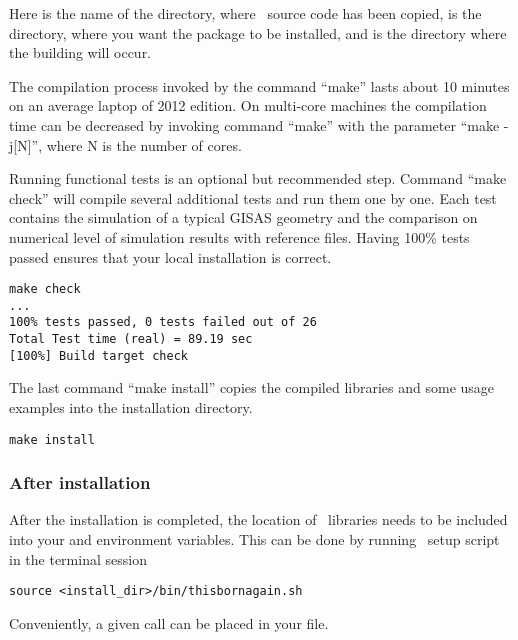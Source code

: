 Here  is the name of the directory, where \BornAgain\ source code has been
copied,  is the directory, where you want the package
to be installed, and  is the directory where the building will occur.



The compilation process invoked by the command ``make'' lasts about 10 minutes on an average laptop
of 2012 edition. On multi-core machines the compilation time  can be decreased by invoking command
``make'' with the parameter ``make -j[N]'', where N is the number of cores.

Running functional tests is an optional but recommended step. Command ``make check''
will compile several additional tests and run them one by one. Each test contains
the simulation of a typical GISAS geometry and the comparison on numerical level of simulation results with reference files. Having 100\% tests passed ensures that your local installation
is correct.
\begin{lstlisting}[language=shell, style=commandline]
make check
...
100% tests passed, 0 tests failed out of 26
Total Test time (real) = 89.19 sec
[100%] Build target check
\end{lstlisting}
\vspace*{3mm}


The last command ``make install'' copies the compiled libraries and some usage examples
into  the installation directory.
\begin{lstlisting}[language=shell, style=commandline]
make install
\end{lstlisting}

\subsubsection{After installation}


After the installation is completed, the location of \BornAgain\ libraries needs to be included into your
 and  environment variables.
This can be done by running \BornAgain\ setup script in the terminal session
\begin{lstlisting}[language=shell, style=commandline]
source <install_dir>/bin/thisbornagain.sh
\end{lstlisting}
Conveniently, a given call can be placed in your  file.



